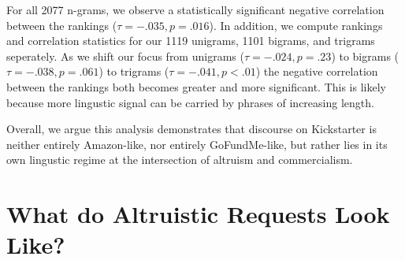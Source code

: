 \documentclass[letterpaper]{article}
\begin{document}
For all 2077 n-grams, we observe a statistically significant negative correlation between the rankings ($\tau = -.035, p = .016$). In addition, we compute rankings and correlation statistics for our 1119 unigrams, 1101 bigrams, and trigrams seperately. As we shift our focus from unigrams ($\tau = -.024, p = .23$) to bigrams ($\tau = -.038, p = .061$) to trigrams ($\tau = -.041, p < .01$) the negative correlation between the rankings both becomes greater and more significant. This is likely because more lingustic signal can be carried by phrases of increasing length.

Overall, we argue this analysis demonstrates that discourse on Kickstarter is neither entirely Amazon-like, nor entirely GoFundMe-like, but rather lies in its own lingustic regime at the intersection of altruism and commercialism.
\section{What do Altruistic Requests Look Like?}
\end{document}
